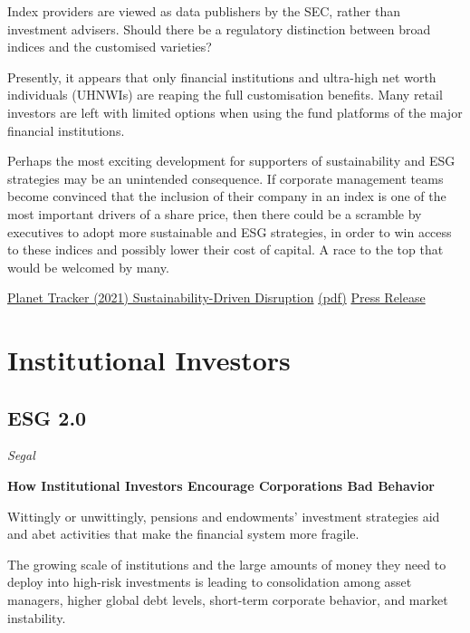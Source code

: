 \documentclass[
]{book}
\begin{document}
Index providers are viewed as data publishers by the SEC, rather than investment advisers. Should
there be a regulatory distinction between broad indices and the customised varieties?

Presently, it appears that only financial institutions and ultra-high net worth individuals (UHNWIs)
are reaping the full customisation benefits. Many retail investors are left with limited options when
using the fund platforms of the major financial institutions.

Perhaps the most exciting development for supporters of sustainability and ESG strategies may be
an unintended consequence. If corporate management teams become convinced that the inclusion
of their company in an index is one of the most important drivers of a share price, then there could
be a scramble by executives to adopt more sustainable and ESG strategies, in order to win access to
these indices and possibly lower their cost of capital. A race to the top that would be welcomed by
many.

\href{https://planet-tracker.org/tracker-programmes/cross-programme-papers/\#indexing-prepare-for-sustainability-driven-disruption}{Planet Tracker (2021) Sustainability-Driven Disruption}
\href{pdf/Planettracker_2021_Indexing.pdf}{(pdf)}
\href{https://planet-tracker.org/large-index-providers-should-prepare-for-disruption-says-planet-tracker/}{Press Release}

\hypertarget{institutional-investors-1}{%
\chapter{Institutional Investors}\label{institutional-investors-1}}

\hypertarget{esg-2.0-1}{%
\section{ESG 2.0}\label{esg-2.0-1}}

\emph{Segal}

\textbf{How Institutional Investors Encourage Corporations Bad Behavior}

Wittingly or unwittingly, pensions and endowments' investment strategies aid and abet activities that make the financial system more fragile.

The growing scale of institutions and the large amounts of money they need to deploy into high-risk investments is leading to consolidation among asset managers, higher global debt levels, short-term corporate behavior, and market instability.
\end{document}
